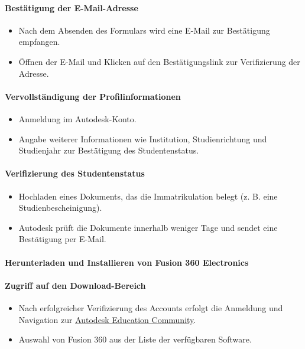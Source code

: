 \paragraph{ Bestätigung der E-Mail-Adresse}
\begin{itemize}
	\item Nach dem Absenden des Formulars wird eine E-Mail zur Bestätigung empfangen.
	\item Öffnen der E-Mail und Klicken auf den Bestätigungslink zur Verifizierung der Adresse.
\end{itemize}

\paragraph{ Vervollständigung der Profilinformationen}
\begin{itemize}
	\item Anmeldung im Autodesk-Konto.
	\item Angabe weiterer Informationen wie Institution, Studienrichtung und Studienjahr zur Bestätigung des Studentenstatus.
\end{itemize}

\paragraph*{ Verifizierung des Studentenstatus}
\begin{itemize}
	\item Hochladen eines Dokuments, das die Immatrikulation belegt (z. B. eine Studienbescheinigung).
	\item Autodesk prüft die Dokumente innerhalb weniger Tage und sendet eine Bestätigung per E-Mail.
\end{itemize}

\paragraph*{ Herunterladen und Installieren von Fusion 360 Electronics}

\paragraph{Zugriff auf den Download-Bereich}
\begin{itemize}
	\item Nach erfolgreicher Verifizierung des Accounts erfolgt die Anmeldung und Navigation zur \href{https://www.autodesk.com/education/home}{\underline{Autodesk Education Community}}.
	\item Auswahl von Fusion 360 aus der Liste der verfügbaren Software.
\end{itemize}

